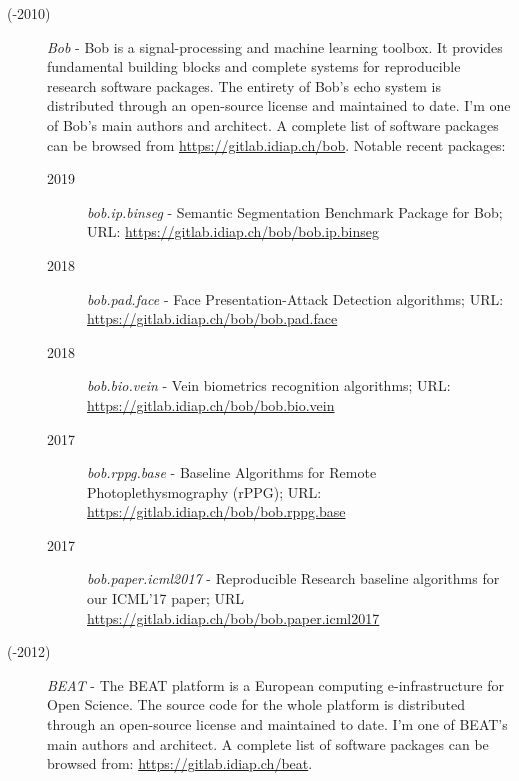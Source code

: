 \documentclass[11pt,a4paper,sans]{moderncv}
\begin{document}
\begin{description}

  \item[\the\year(-2010)] \textit{Bob} - Bob is a signal-processing and machine
    learning toolbox.  It provides fundamental building blocks and complete
    systems for reproducible research software packages.  The entirety of Bob's
    echo system is distributed through an open-source license and maintained to
    date. I'm one of Bob's main authors and architect.  A complete list of
    software packages can be browsed from \url{https://gitlab.idiap.ch/bob}.
    Notable recent packages:

    \begin{description}
      \item[2019] \textit{bob.ip.binseg} - Semantic Segmentation Benchmark
          Package for Bob; URL: \url{https://gitlab.idiap.ch/bob/bob.ip.binseg}

      \item[2018] \textit{bob.pad.face} - Face Presentation-Attack Detection
        algorithms; URL: \url{https://gitlab.idiap.ch/bob/bob.pad.face}

      \item[2018] \textit{bob.bio.vein} - Vein biometrics recognition
        algorithms; URL: \url{https://gitlab.idiap.ch/bob/bob.bio.vein}

      \item[2017] \textit{bob.rppg.base} - Baseline Algorithms for Remote
        Photoplethysmography (rPPG); URL:
        \url{https://gitlab.idiap.ch/bob/bob.rppg.base}

      \item[2017] \textit{bob.paper.icml2017} - Reproducible Research baseline
        algorithms for our ICML'17 paper; URL
        \url{https://gitlab.idiap.ch/bob/bob.paper.icml2017}
    \end{description}


  \item[\the\year(-2012)] \textit{BEAT} - The BEAT platform is a European
    computing e-infrastructure for Open Science.  The source code for the whole
    platform is distributed through an open-source license and maintained to
    date.  I'm one of BEAT's main authors and architect.  A complete list of
    software packages can be browsed from: \url{https://gitlab.idiap.ch/beat}.

\end{description}
\end{document}
